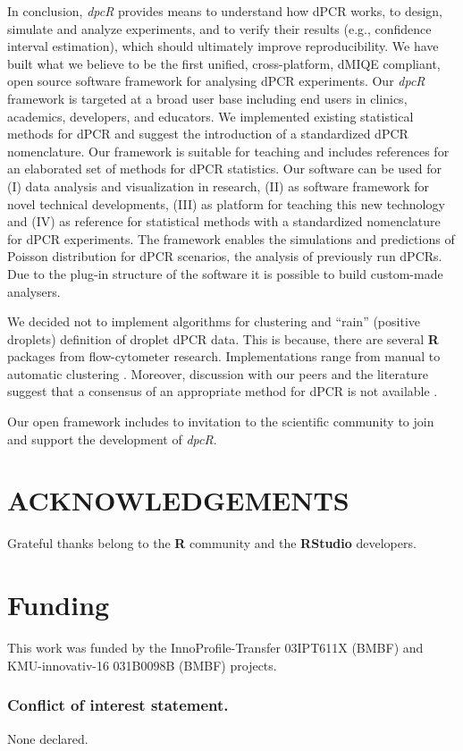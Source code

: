 \documentclass[a4,center,fleqn]{NAR}
\begin{document}
In conclusion, \textit{dpcR} provides means to understand how dPCR works, to 
design, simulate and analyze experiments, and to verify their results (e.g., 
confidence interval estimation), which should ultimately improve 
reproducibility. We have built what we believe to be the first unified, 
cross-platform, dMIQE compliant, open source software framework for analysing 
dPCR experiments. Our \textit{dpcR} framework is targeted at a broad user base 
including end users in clinics, academics, developers, and educators. We 
implemented existing statistical methods for dPCR and suggest the introduction 
of a standardized dPCR nomenclature. Our framework is suitable for teaching and 
includes references for an elaborated set of methods for dPCR statistics. Our 
software can be used for (I) data analysis and visualization in research, (II) 
as software framework for novel technical developments, (III) as platform for 
teaching this new technology and (IV) as reference for statistical methods with 
a standardized nomenclature for dPCR experiments. The framework enables the 
simulations and predictions of Poisson distribution for dPCR scenarios, the 
analysis of previously run dPCRs. Due to the plug-in structure of the software 
it is possible to build custom-made analysers.

We decided not to implement algorithms for clustering and ``rain'' (positive 
droplets) definition of droplet dPCR data. This is because, there are several 
\textbf{R} packages from flow-cytometer research. Implementations range from 
manual to automatic clustering \cite{le_meur_computational_2013, 
milbury_determining_2014, Malek15022015, trypsteen_ddpcrquant_2015}. Moreover, 
discussion with our peers and the literature suggest that a consensus of an 
appropriate method for dPCR is not available \cite{trypsteen_ddpcrquant_2015}.

Our open framework includes to invitation to the scientific community to join 
and support the development of \textit{dpcR}.


\section{ACKNOWLEDGEMENTS}

Grateful thanks belong to the \textbf{R} community and the \textbf{RStudio} 
developers.

\section{Funding}
This work was funded by the InnoProfile-Transfer 03IPT611X (BMBF) and 
KMU-innovativ-16 031B0098B (BMBF) projects.

\subsubsection{Conflict of interest statement.} None declared.



\end{document}
